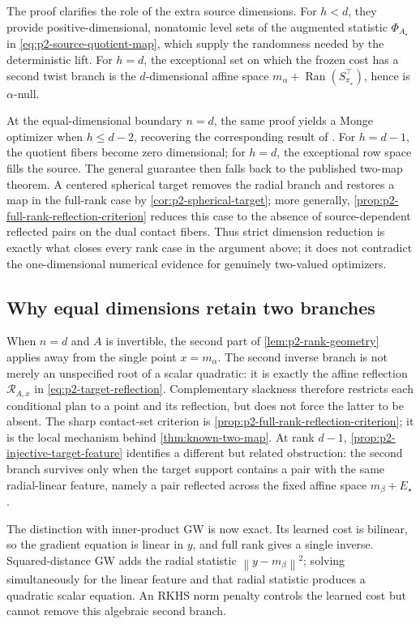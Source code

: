 \documentclass[11pt,a4paper]{article}
\theoremstyle{definition}
\theoremstyle{remark}
\newcommand{\Ran}{\operatorname{Ran}}
\newcommand{\norm}[1]{\left\lVert #1\right\rVert}
\begin{document}
The proof clarifies the role of the extra source dimensions.  For
\(h<d\), they provide positive-dimensional, nonatomic level sets of the
augmented statistic \(\Phi_{A_\star}\) in
\eqref{eq:p2-source-quotient-map},
which supply the randomness needed by the deterministic lift.  For \(h=d\),
the exceptional set on which the frozen cost has a second twist branch is the
\(d\)-dimensional affine space
\(m_\alpha+\Ran(S_{\pi_\star}^\top)\), hence is \(\alpha\)-null.

At the equal-dimensional boundary \(n=d\), the same proof yields a Monge
optimizer when \(h\leq d-2\), recovering the corresponding result of
\citet{DumontLacombeVialard2025}.  For \(h=d-1\), the quotient fibers become
zero dimensional; for \(h=d\), the exceptional row space fills the source.
The general guarantee then falls back to the published two-map theorem.  A
centered spherical target removes the radial branch and restores a map in the
full-rank case by \cref{cor:p2-spherical-target}; more generally,
\cref{prop:p2-full-rank-reflection-criterion} reduces this case to the absence
of source-dependent reflected pairs on the dual contact fibers.  Thus strict
dimension reduction is exactly what closes every rank case in the argument
above; it does not contradict the one-dimensional numerical evidence for
genuinely two-valued optimizers.

\subsection{Why equal dimensions retain two branches}

When \(n=d\) and \(A\) is invertible, the second part of
\cref{lem:p2-rank-geometry} applies away from the single point
\(x=m_\alpha\).  The second inverse branch is not merely an unspecified root
of a scalar quadratic: it is exactly the affine reflection
\(\mathscr R_{A,x}\) in \eqref{eq:p2-target-reflection}.  Complementary
slackness therefore restricts each conditional plan to a point and its
reflection, but does not force the latter to be absent.  The sharp contact-set
criterion is \cref{prop:p2-full-rank-reflection-criterion}; it is the local
mechanism behind \cref{thm:known-two-map}.  At rank \(d-1\),
\cref{prop:p2-injective-target-feature} identifies a different but related
obstruction: the second branch survives only when the target support contains
a pair with the same radial-linear feature, namely a pair reflected across the
fixed affine space \(m_\beta+E_\star\).

The distinction with inner-product GW is now exact.  Its learned cost is
bilinear, so the gradient equation is linear in \(y\), and full rank gives a
single inverse.  Squared-distance GW adds the radial statistic
\(\norm{y-m_\beta}^2\); solving simultaneously for the linear feature and
that radial statistic produces a quadratic scalar equation.  An RKHS norm
penalty controls the learned cost but cannot remove this algebraic second
branch.
\end{document}
